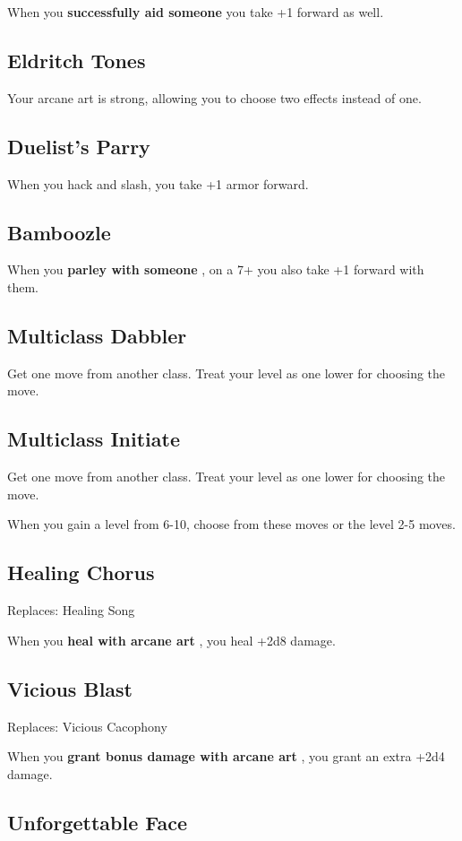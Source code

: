  When you \textbf{successfully aid someone}
 you take +1 forward as well.
\subsection{Eldritch Tones}


 Your arcane art is strong, allowing you to choose two effects instead of one.
\subsection{Duelist's Parry}


 When you hack and slash, you take +1 armor forward.
\subsection{Bamboozle}


 When you \textbf{parley with someone}
, on a 7+ you also take +1 forward with them.
\subsection{Multiclass Dabbler}


 Get one move from another class. Treat your level as one lower for choosing the move.
\subsection{Multiclass Initiate}


 Get one move from another class. Treat your level as one lower for choosing the move.

\vspace{\baselineskip}
 {\Large When you gain a level from 6-10, choose from these moves or the level 2-5 moves.}
\subsection{Healing Chorus}


 Replaces: Healing Song


 When you \textbf{heal with arcane art}
, you heal +2d8 damage.
\subsection{Vicious Blast}


 Replaces: Vicious Cacophony


 When you \textbf{grant bonus damage with arcane art}
, you grant an extra +2d4 damage.
\subsection{Unforgettable Face}


